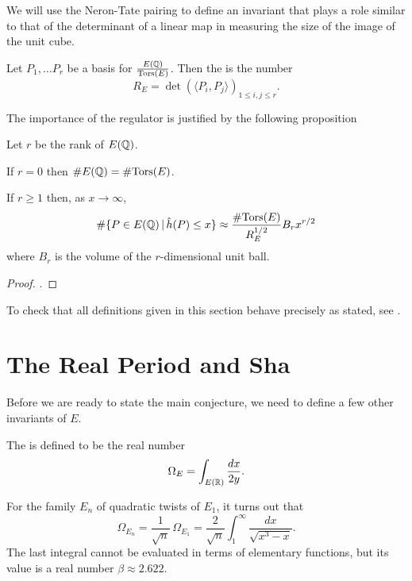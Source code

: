 \documentclass[12pt, a4paper]{report}
\begin{document}
We will use the Neron-Tate pairing to define an invariant that plays a role
similar to that of the determinant of a linear map in measuring the size of
the image of the unit cube.

\begin{defn}[Regulator]
  Let $P_1, \dots P_r$ be a basis for $\frac{{E({\mathbb Q})}}{{\text{\normalfont Tors}} (E)}$.
  Then the  is the number
  \[R_E = \det ( \langle P_i, P_j \rangle)_{1\leq i, j \leq r}.\]
\end{defn}

The importance of the regulator is justified by the following proposition

\begin{prop}
  Let $r$ be the rank of $E({\mathbb Q})$.

  If $r = 0$ then $\# E({\mathbb Q}) = \# {\text{\normalfont Tors}}(E)$.

  If $r \geq 1$ then, as $x \rightarrow \infty$,
  \[\# \{P \in E({\mathbb Q}) \, | \, \hat{h}(P) \leq x \} \approx \frac{\#
      {\text{\normalfont Tors}}(E)}{R_E^{1/2}}
    B_r x^{r/2}\]
  where $B_r$ is the volume of the $r$-dimensional unit ball.
\end{prop}
\begin{proof}
  \cite[See][Chapter 13.7, page 127]{Granville}.
\end{proof}
  

\begin{remark}
  To check that all definitions given in this section behave precisely as
  stated, see \cite[Chapter 13.7-8, pages 123-127]{Granville}.
\end{remark}
  

\section{The Real Period and Sha}

Before we are ready to state the main conjecture, we need to define a few
other invariants of $E$. 

\begin{defn} 
  The  is defined to be the real number
  \[\Omega_E = \int_{E({\mathbb R})} \frac{dx}{2y}.\]

  For the family $E_n$ of quadratic twists of $E_1$, it turns out that
  \[\Omega_{E_n} = \frac{1}{\sqrt{n}} \, \Omega_{E_1} = \frac{2}{\sqrt{n}}
    \int_1^\infty \frac{dx}{\sqrt{x^3-x}}.\]
  The last integral cannot be evaluated in terms of elementary functions, but
  its value is a real number $\beta \approx 2.622$.
\end{defn}
\end{document}
